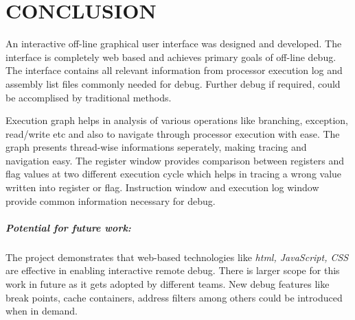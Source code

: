 \chapter{CONCLUSION}
\label{chap:GUI_conclusion}

An interactive off-line graphical user interface was designed and developed. The interface is completely web based and achieves primary goals of off-line debug. The interface contains all relevant information from processor execution log and assembly list files commonly needed for debug. Further debug if required, could be accomplised by traditional methods.

Execution graph helps in analysis of various operations like branching, exception, read/write etc and also to navigate through processor execution with ease. The graph presents thread-wise informations seperately, making tracing and navigation easy. The register window provides comparison between registers and flag values at two different execution cycle which helps in tracing a wrong value written into register or flag. Instruction window and execution log window provide common information necessary for debug.

\paragraph{Potential for future work:} The project demonstrates that web-based technologies like {\it html, JavaScript, CSS} are effective in enabling interactive remote debug. There is larger scope for this work in future as it gets adopted by different teams. New debug features like break points, cache containers, address filters among others could be introduced when in demand.

